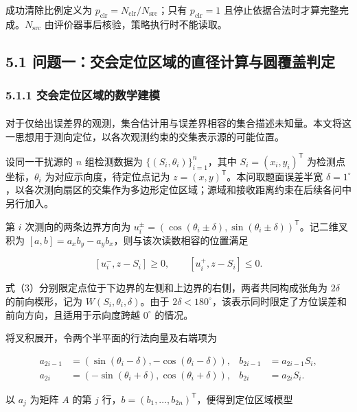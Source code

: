 \documentclass[UTF8,fontset=none,zihao=-4,a4paper]{ctexart}
\begin{document}
成功清除比例定义为 \(p_{\mathrm{clr}}=N_{\mathrm{clr}}/N_{\mathrm{src}}\)；只有 \(p_{\mathrm{clr}}=1\) 且停止依据合法时才算完整完成。\(N_{\mathrm{src}}\) 由评价器事后核验，策略执行时不能读取。

\FloatBarrier
\subsection{5.1 问题一：交会定位区域的直径计算与圆覆盖判定}\label{ux95eeux9898ux4e00ux4ea4ux4f1aux5b9aux4f4dux533aux57dfux7684ux76f4ux5f84ux8ba1ux7b97ux4e0eux5706ux8986ux76d6ux5224ux5b9a}

\subsubsection{5.1.1 交会定位区域的数学建模}\label{ux4ea4ux4f1aux5b9aux4f4dux533aux57dfux7684ux6570ux5b66ux5efaux6a21}

对于仅给出误差界的观测，集合估计用与误差界相容的集合描述未知量\textsuperscript{\cite{milanese1991}}。本文将这一思想用于测向定位，以各次观测约束的交集表示源的可能位置。

设同一干扰源的 \(n\) 组检测数据为 \(\{(S_i,\theta_i)\}_{i=1}^n\)，其中 \(S_i=(x_i,y_i)^{\mathsf T}\) 为检测点坐标，\(\theta_i\) 为对应示向度，待定位点记为 \(z=(x,y)^{\mathsf T}\)。本问取题面误差半宽 \(\delta=1^\circ\)，以各次测向扇区的交集作为多边形定位区域；源域和接收距离约束在后续各问中另行加入。

第 \(i\) 次测向的两条边界方向为 \(u_i^{\pm}=(\cos(\theta_i\pm\delta),\sin(\theta_i\pm\delta))^{\mathsf T}\)。记二维叉积为 \([a,b]=a_xb_y-a_yb_x\)，则与该次读数相容的位置满足

\[
[u_i^-,z-S_i]\ge0,\qquad [u_i^+,z-S_i]\le0. \tag{3}
\]

式（3）分别限定点位于下边界的左侧和上边界的右侧，两者共同构成张角为 \(2\delta\) 的前向楔形，记为 \(W(S_i,\theta_i,\delta)\)。由于 \(2\delta<180^\circ\)，该表示同时限定了方位误差和前向方向，且适用于示向度跨越 \(0^\circ\) 的情况。

将叉积展开，令两个半平面的行法向量及右端项为

\[
\begin{aligned}
a_{2i-1}&=(\sin(\theta_i-\delta),-\cos(\theta_i-\delta)),
& b_{2i-1}&=a_{2i-1}S_i,\\
a_{2i}&=(-\sin(\theta_i+\delta),\cos(\theta_i+\delta)),
& b_{2i}&=a_{2i}S_i.
\end{aligned}
\]

以 \(a_j\) 为矩阵 \(A\) 的第 \(j\) 行，\(b=(b_1,\ldots,b_{2n})^{\mathsf T}\)，便得到定位区域模型
\end{document}
